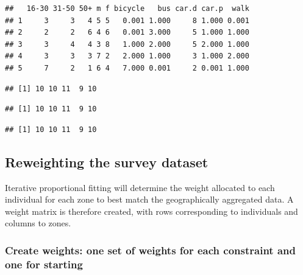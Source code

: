 \begin{verbatim}
##   16-30 31-50 50+ m f bicycle   bus car.d car.p  walk
## 1     3     3   4 5 5   0.001 1.000     8 1.000 0.001
## 2     2     2   6 4 6   0.001 3.000     5 1.000 1.000
## 3     3     4   4 3 8   1.000 2.000     5 2.000 1.000
## 4     3     3   3 7 2   2.000 1.000     3 1.000 2.000
## 5     7     2   1 6 4   7.000 0.001     2 0.001 1.000
\end{verbatim}
\begin{Shaded}
\begin{Highlighting}[]

\NormalTok{(all.msim[,}\NormalTok{:}\NormalTok{]) }
\end{Highlighting}
\end{Shaded}
\begin{verbatim}
## [1] 10 10 11  9 10
\end{verbatim}
\begin{Shaded}
\begin{Highlighting}[]
\NormalTok{(all.msim[,}\NormalTok{:}\NormalTok{]) }
\end{Highlighting}
\end{Shaded}
\begin{verbatim}
## [1] 10 10 11  9 10
\end{verbatim}
\begin{Shaded}
\begin{Highlighting}[]
\NormalTok{(all.msim[,}\NormalTok{:}\NormalTok{])}
\end{Highlighting}
\end{Shaded}
\begin{verbatim}
## [1] 10 10 11  9 10
\end{verbatim}
\subsection{Reweighting the survey dataset}

Iterative proportional fitting will determine the weight allocated to
each individual for each zone to best match the geographically
aggregated data. A weight matrix is therefore created, with rows
corresponding to individuals and columns to zones.

\subsubsection{Create weights: one set of weights for each constraint
and one for starting}

